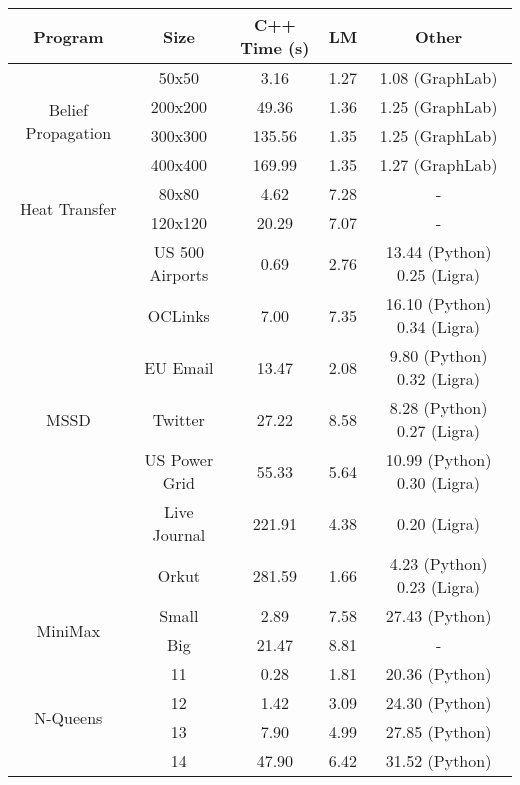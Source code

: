 \begin{tabular}{c | c || c | c | c} \hline
	\textbf{Program} & \textbf{Size} & \textbf{C++ Time} (s) & \textbf{LM} & \textbf{Other} \\ \hline \hline
	\multirow{4}{*}{Belief Propagation}  & 50x50 &  3.16  &  1.27  &  1.08 (GraphLab) \\
		 & 200x200 &  49.36  &  1.36  &  1.25 (GraphLab) \\
		 & 300x300 &  135.56  &  1.35  &  1.25 (GraphLab) \\
		 & 400x400 &  169.99  &  1.35  &  1.27 (GraphLab) \\
	\hline
	\multirow{2}{*}{Heat Transfer}  & 80x80 &  4.62  &  7.28  &  - \\
		 & 120x120 &  20.29  &  7.07  &  - \\
	\hline
	\multirow{7}{*}{MSSD}  & US 500 Airports &  0.69  &  2.76  &  13.44 (Python) 0.25 (Ligra) \\
		 & OCLinks &  7.00  &  7.35  &  16.10 (Python) 0.34 (Ligra) \\
		 & EU Email &  13.47  &  2.08  &  9.80 (Python) 0.32 (Ligra) \\
		 & Twitter &  27.22  &  8.58  &  8.28 (Python) 0.27 (Ligra) \\
		 & US Power Grid &  55.33  &  5.64  &  10.99 (Python) 0.30 (Ligra) \\
		 & Live Journal &  221.91  &  4.38  &  0.20 (Ligra) \\
		 & Orkut &  281.59  &  1.66  &  4.23 (Python) 0.23 (Ligra) \\
	\hline
	\multirow{2}{*}{MiniMax}  & Small &  2.89  &  7.58  &  27.43 (Python) \\
		 & Big &  21.47  &  8.81  &  - \\
	\hline
	\multirow{4}{*}{N-Queens}  & 11 &  0.28  &  1.81  &  20.36 (Python) \\
		 & 12 &  1.42  &  3.09  &  24.30 (Python) \\
		 & 13 &  7.90  &  4.99  &  27.85 (Python) \\
		 & 14 &  47.90  &  6.42  &  31.52 (Python) \\
	\hline
\end{tabular}
